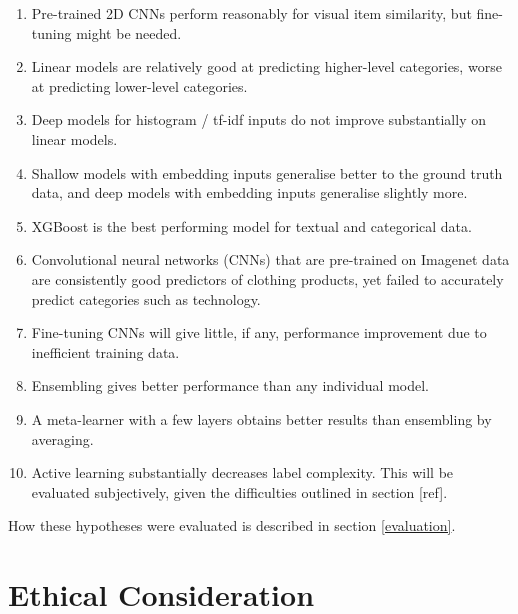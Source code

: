 \begin{enumerate}
  \item Pre-trained 2D CNNs perform reasonably for visual item similarity, but fine-tuning might be needed.
  \item Linear models are relatively good at predicting higher-level categories, worse at predicting lower-level categories.
  \item Deep models for histogram / tf-idf inputs do not improve substantially on linear models.
  \item Shallow models with embedding inputs generalise better to the ground truth data, and deep models with embedding inputs generalise slightly more.
  \item XGBoost is the best performing model  for textual and categorical data.
  \item Convolutional  neural networks (CNNs) that are pre-trained on Imagenet data are consistently good predictors  of clothing products, yet failed to accurately predict categories such as technology.
  \item Fine-tuning CNNs  will give little, if any,  performance  improvement due to inefficient training data.
  \item Ensembling  gives better performance than any individual model.
  \item A meta-learner with a few layers  obtains better results than ensembling by averaging.
  \item Active learning substantially decreases label complexity.  This will be evaluated subjectively, given the  difficulties outlined in section [ref].
\end{enumerate}

\hfill \break
How these hypotheses were evaluated is described in section \ref{evaluation}.


\section{Ethical Consideration}


